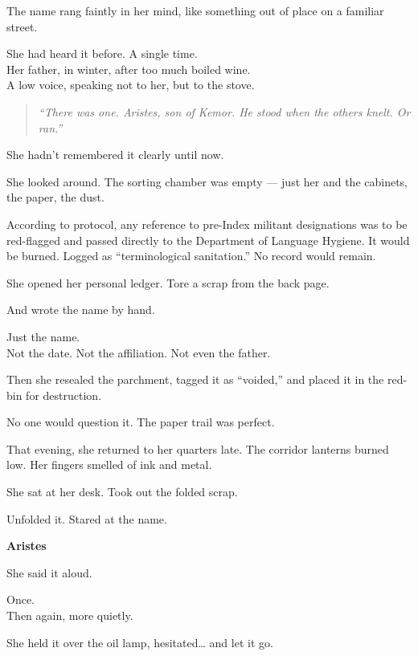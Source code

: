 \documentclass[12pt]{article}
\begin{document}
The name rang faintly in her mind, like something out of place on a familiar street.

She had heard it before. A single time.\\
Her father, in winter, after too much boiled wine.\\
A low voice, speaking not to her, but to the stove.

\begin{quote}
\textit{“There was one. Aristes, son of Kemor. He stood when the others knelt. Or ran.”}
\end{quote}

She hadn’t remembered it clearly until now.

She looked around. The sorting chamber was empty --- just her and the cabinets, the paper, the dust.

\vspace{1em}

According to protocol, any reference to pre-Index militant designations was to be red-flagged and passed directly to the Department of Language Hygiene. It would be burned. Logged as “terminological sanitation.” No record would remain.

She opened her personal ledger. Tore a scrap from the back page.

And wrote the name by hand.

Just the name.\\
Not the date. Not the affiliation. Not even the father.

Then she resealed the parchment, tagged it as “voided,” and placed it in the red-bin for destruction.

No one would question it. The paper trail was perfect.

\vspace{1em}

That evening, she returned to her quarters late. The corridor lanterns burned low. Her fingers smelled of ink and metal.

She sat at her desk. Took out the folded scrap.

Unfolded it. Stared at the name.

\begin{center}
\textbf{Aristes}
\end{center}

She said it aloud.

Once.\\
Then again, more quietly.

She held it over the oil lamp, hesitated… and let it go.
\end{document}
